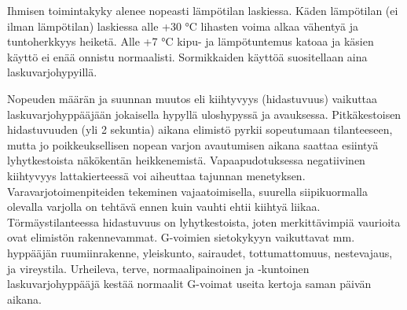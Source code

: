 Ihmisen toimintakyky alenee nopeasti lämpötilan laskiessa. Käden lämpötilan (ei ilman lämpötilan) laskiessa alle +30 °C lihasten voima alkaa vähentyä ja tuntoherkkyys heiketä. Alle +7 °C kipu- ja lämpötuntemus katoaa ja käsien käyttö ei enää onnistu normaalisti. Sormikkaiden käyttöä suositellaan aina laskuvarjohypyillä. 


Nopeuden määrän ja suunnan muutos eli kiihtyvyys (hidastuvuus) vaikuttaa laskuvarjohyppääjään jokaisella hypyllä uloshypyssä ja avauksessa. Pitkäkestoisen hidastuvuuden (yli 2 sekuntia) aikana elimistö pyrkii sopeutumaan tilanteeseen, mutta jo poikkeuksellisen nopean varjon avautumisen aikana saattaa esiintyä lyhytkestoista näkökentän heikkenemistä. Vapaapudotuksessa negatiivinen kiihtyvyys lattakierteessä voi aiheuttaa tajunnan menetyksen.  Varavarjotoimenpiteiden tekeminen vajaatoimisella, suurella siipikuormalla olevalla varjolla on tehtävä ennen kuin vauhti ehtii kiihtyä liikaa.  Törmäystilanteessa hidastuvuus on lyhytkestoista, joten merkittävimpiä vaurioita ovat elimistön rakennevammat. G-voimien sietokykyyn vaikuttavat mm. hyppääjän ruumiinrakenne, yleiskunto, sairaudet, tottumattomuus, nestevajaus, ja vireystila. Urheileva, terve, normaalipainoinen ja -kuntoinen laskuvarjohyppääjä kestää normaalit G-voimat useita kertoja saman päivän aikana. 

